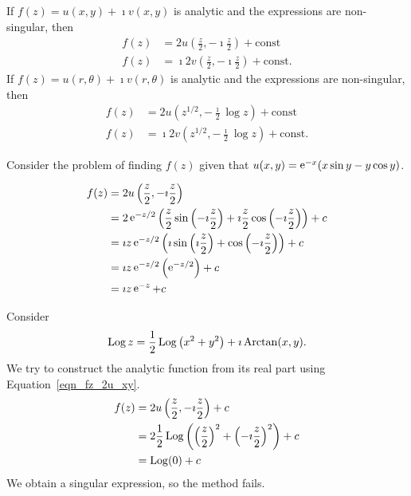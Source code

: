 \begin{Result}
  If $f(z) = u(x,y) + \imath v(x,y)$ is analytic 
  and the expressions are non-singular, then 
  \begin{align}
    \label{eqn_fz_2u_xy}
    f(z) &= 2 u \left( \frac{z}{2}, -\imath \frac{z}{2} \right) 
    + \mathrm{const} 
    \\
    f(z) &= \imath 2 v \left( \frac{z}{2}, -\imath \frac{z}{2} \right) 
    + \mathrm{const}.
  \end{align}
  If $f(z) = u(r,\theta) + \imath v(r,\theta)$ is analytic 
  and the expressions are non-singular, then 
  \begin{align}
    \label{eqn_fz_2u_rt}
    f(z) &= 2 u \left( z^{1/2}, - \frac{\imath}{2} \log z \right) + \mathrm{const} 
    \\
    f(z) &= \imath 2 v \left( z^{1/2}, - \frac{\imath}{2} \log z \right) + \mathrm{const}.
  \end{align}
\end{Result}






\begin{Example}
  Consider the problem of finding $f(z)$ given that
  $u(x, y) = \mathop{\mathrm{e}}\nolimits^{-x} (x \sin y - y \cos y )$.

  \begin{align*}
    f(z)    
    &= 2 u \left( \frac{z}{2}, -\imath \frac{z}{2} \right) \\
    &= 2 \mathop{\mathrm{e}}\nolimits^{-z/2} \left( \frac{z}{2} \sin \left( - \imath \frac{z}{2} \right)
      + \imath \frac{z}{2} \cos \left( -\imath \frac{z}{2} \right) \right) + c 
    \\
    &= \imath z \mathop{\mathrm{e}}\nolimits^{-z/2} \left( \imath \sin \left( \imath \frac{z}{2} \right)
      + \cos \left( -\imath \frac{z}{2} \right) \right) + c 
    \\
    &= \imath z \mathop{\mathrm{e}}\nolimits^{-z/2} \left( \mathop{\mathrm{e}}\nolimits^{-z/2} \right) + c 
    \\
    &= \imath z \mathop{\mathrm{e}}\nolimits^{-z} + c 
  \end{align*}
\end{Example}









\begin{Example}
  Consider
  \[
  \mathop{\mathrm{Log}}\nolimits z = \frac{1}{2} \mathop{\mathrm{Log}}\nolimits \left( x^2 + y^2 \right) + \imath \mathop{\mathrm{Arctan}}\nolimits(x, y).
  \]
  We try to construct the analytic function from its real part using
  Equation~\ref{eqn_fz_2u_xy}. 
  \begin{align*}
    f(z)
    &= 2 u \left( \frac{z}{2}, -\imath \frac{z}{2} \right) + c
    \\
    &= 2 \frac{1}{2} \mathop{\mathrm{Log}}\nolimits \left( \left( \frac{z}{2} \right)^2
      + \left( -\imath \frac{z}{2} \right)^2 \right) + c
    \\
    &= \mathop{\mathrm{Log}}\nolimits(0) + c
  \end{align*}
  We obtain a singular expression, so the method fails.
\end{Example}






